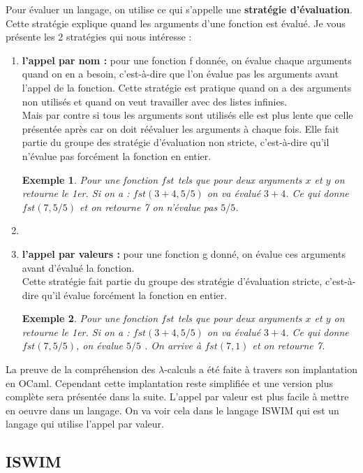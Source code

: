 \documentclass[10pt,a4paper]{report}
\newtheorem{ex}{Exemple}
\begin{document}
Pour évaluer un langage, on utilise ce qui s'appelle une \textbf{stratégie d'évaluation}. Cette stratégie explique quand les arguments d'une fonction est évalué. Je vous présente les 2 stratégies qui nous intéresse :
\begin{enumerate}
\item \textbf{l'appel par nom :} pour une fonction f donnée, on évalue chaque arguments quand on en a besoin, c'est-à-dire que l'on évalue pas les arguments avant l'appel de la fonction. Cette stratégie est pratique quand on a des arguments non utilisés  et quand on veut travailler avec des listes infinies. 
\\Mais par contre si tous les arguments sont utilisés elle est plus lente que celle présentée après car on doit réévaluer les arguments à chaque fois. Elle fait partie du groupe des stratégie d'évaluation non stricte, c'est-à-dire qu'il n'évalue pas forcément la fonction en entier. 
  \begin{ex}
  	Pour une fonction $fst$ tels que pour deux arguments $x$ et $y$ on retourne le 1er. Si on a : $fst(3+4,5/5)$ on va évalué $3+4$. Ce qui donne $fst(7,5/5)$ et on retourne 7 on n'évalue pas $5/5$.
  \end{ex}
\item[]
\item  \textbf{l'appel par valeurs :} pour une fonction g donné, on évalue ces arguments avant d'évalué la fonction.
  \\Cette stratégie fait partie du groupe des stratégie d'évaluation stricte, c'est-à-dire qu'il évalue forcément la fonction en entier.
  \begin{ex}
  	Pour une fonction $fst$ tels que pour deux arguments $x$ et $y$ on retourne le 1er. Si on a : $fst(3+4,5/5)$ on va évalué $3+4$. Ce qui donne $fst(7,5/5)$, on évalue $5/5$ . On arrive à $fst(7,1)$ et on retourne 7.
  \end{ex}
\end{enumerate}
\medbreak

La preuve de la compréhension des $\lambda$-calculs a été faite à travers son implantation en OCaml. Cependant cette implantation reste simplifiée et une version plus complète sera présentée dans la suite. 
\smallbreak
L'appel par valeur est plus facile à mettre en oeuvre dans un langage.
On va voir cela dans le langage ISWIM qui est un langage qui utilise l'appel par valeur.
\newpage



\subsection{ISWIM}	
\end{document}
